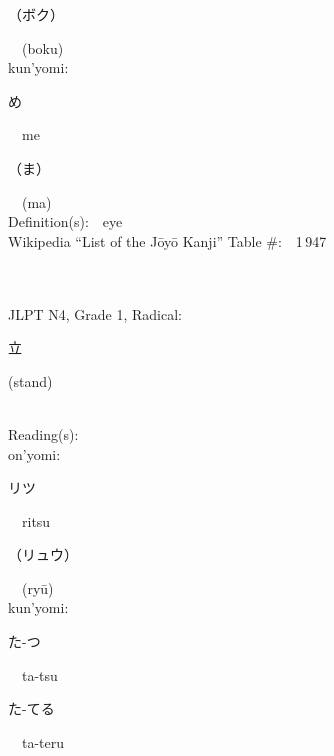 \begin{multicols}{2}
{\hspace*{2em}}{\begin{CJK}{UTF8}{min} （ボク） \end{CJK}}\ \ (boku)\ \ \\
{\hspace*{1em}}kun'yomi:\ \ \\
{\hspace*{2em}}{\begin{CJK}{UTF8}{min} め \end{CJK}}\ \ me\ \ \\
{\hspace*{2em}}{\begin{CJK}{UTF8}{min} （ま） \end{CJK}}\ \ (ma)\ \ \\
Definition(s):\ \ eye \\
Wikipedia ``List of the J\=oy\=o Kanji'' Table \#:\ \ 1\,947 \\
\ \ \\
{\fontsize{34pt}{40pt}  }\ \ \\  %
{JLPT N4, Grade 1, Radical:\ \ {\begin{CJK}{UTF8}{min} 立 \end{CJK}} (stand) } \\
Reading(s):\ \ \\
{\hspace*{1em}}on'yomi:\ \ \\
{\hspace*{2em}}{\begin{CJK}{UTF8}{min} リツ \end{CJK}}\ \ ritsu\ \ \\
{\hspace*{2em}}{\begin{CJK}{UTF8}{min} （リュウ） \end{CJK}}\ \ (ry\=u)\ \ \\
{\hspace*{1em}}kun'yomi:\ \ \\
{\hspace*{2em}}{\begin{CJK}{UTF8}{min} た-つ \end{CJK}}\ \ ta-tsu\ \ \\
{\hspace*{2em}}{\begin{CJK}{UTF8}{min} た-てる \end{CJK}}\ \ ta-teru\ \ \\

\end{multicols}

